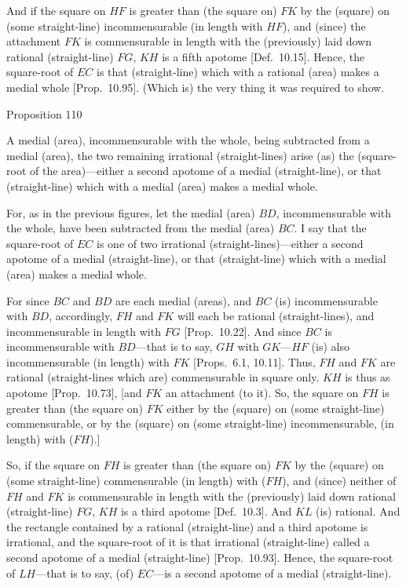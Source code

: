 And if the square on $HF$ is greater than (the square on) $FK$
by the (square) on (some straight-line) incommensurable (in length with $HF$),
and (since) the attachment $FK$ is commensurable
in length with the (previously) laid down rational (straight-line) $FG$,
$KH$ is a fifth apotome [Def.~10.15]. Hence,
the square-root of $EC$ is that (straight-line) which with a rational (area)
makes a medial whole [Prop.~10.95]. 
(Which is) the very thing it was required to show.


\begin{center}
{\large Proposition 110}
\end{center}

A medial (area), incommensurable with the whole, being subtracted
from a medial (area),  the two remaining
irrational (straight-lines) arise (as) the (square-root of the area)---either a second apotome of a medial (straight-line), 
or that (straight-line) which with a medial (area) makes a medial whole.

For, as in the previous figures, let the medial (area) $BD$, incommensurable with the whole, have been subtracted from the medial (area) $BC$. I say that
the square-root of $EC$ is one of two irrational (straight-lines)---either
a second apotome of a medial (straight-line), or that (straight-line) which
with a medial (area) makes a medial whole.

\epsfysize=2.2in
\centerline{}

For since $BC$ and $BD$ are each medial (areas), and $BC$ (is) incommensurable with $BD$, accordingly,  $FH$ and $FK$ will each be rational (straight-lines), and incommensurable
in length with $FG$ [Prop.~10.22]. And
since $BC$ is incommensurable with $BD$---that is to say, $GH$ with
$GK$---$HF$ (is) also incommensurable (in length) with $FK$ [Props.~6.1, 10.11]. Thus,
$FH$ and $FK$ are rational (straight-lines which are) commensurable
in square only. $KH$ is thus as apotome [Prop.~10.73], [and $FK$ an attachment (to it).
So, the square on $FH$ is  greater than (the square on)
$FK$ either by the (square) on (some straight-line) commensurable, or by the (square) on (some straight-line) incommensurable, (in length)
with ($FH$).]

So, if the square on $FH$ is greater than (the square on) $FK$ by the
(square) on (some straight-line) commensurable (in length) with ($FH$),
and (since) neither of $FH$ and $FK$ is commensurable in length with
the (previously) laid down rational (straight-line) $FG$, $KH$ is a
third apotome [Def.~10.3]. And $KL$ (is) rational.
And the rectangle contained by a rational (straight-line) and a third
apotome is irrational, and the square-root of it is that irrational (straight-line)
called a second apotome of a medial (straight-line) [Prop.~10.93]. Hence, the square-root of $LH$---that is to say, (of) $EC$---is a second apotome of a medial (straight-line).

